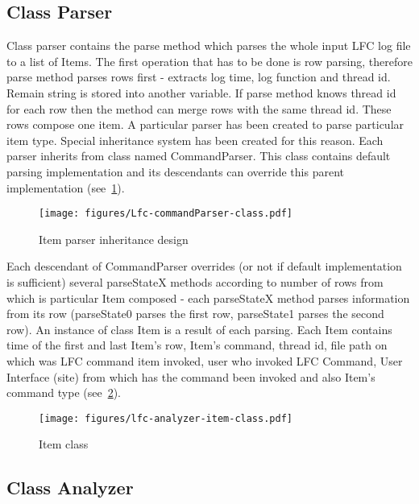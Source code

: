 \documentclass[a4paper, 11pt]{article} %
\begin{document}
\subsection{Class Parser}
\label{c:parser}

Class parser contains the parse method which parses the whole input LFC log file to a list of Items. The first operation that has to be done is row parsing, therefore parse method parses rows first - extracts log time, log function and thread id. Remain string is stored into another variable. If parse method knows thread id for each row then the method can merge rows with the same thread id. These rows compose one item. A particular parser has been created to parse particular item type. Special inheritance system has been created for this reason. Each parser inherits from class named CommandParser. This class contains default parsing implementation and its descendants can override this parent implementation (see~\ref{fig:commandparser}). 

\begin{figure}[H]
  \centering
    \texttt{[image: figures/Lfc-commandParser-class.pdf]}
    \caption{Item parser inheritance design}
    \label{fig:commandparser}
\end{figure}

Each descendant of CommandParser overrides (or not if default implementation is sufficient) several parseStateX methods according to number of rows from which is particular Item composed - each parseStateX method parses information from its row (parseState0 parses the first row, parseState1 parses the second row). An instance of class Item is a result of each parsing. Each Item contains time of the first and last Item's row, Item's command, thread id, file path on which was LFC command item invoked, user who invoked LFC Command, User Interface (site) from which has the command been invoked and also Item's command type (see~\ref{fig:item}).

\begin{figure}[H]
  \centering
    \texttt{[image: figures/lfc-analyzer-item-class.pdf]}
    \caption{Item class}
    \label{fig:item}
\end{figure}

\subsection{Class Analyzer}
\label{c:analyzer}
\end{document}
